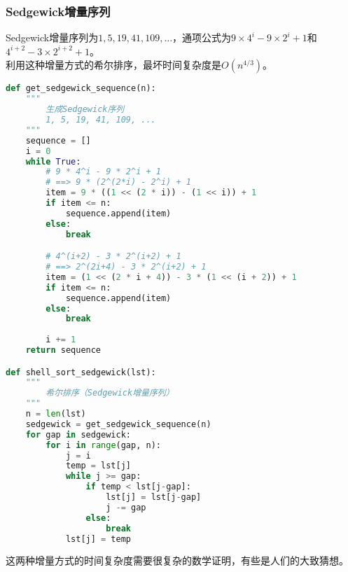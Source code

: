 \subsubsection{Sedgewick增量序列}

Sedgewick增量序列为$ 1, 5, 19, 41, 109, \dots $，通项公式为$ 9 \times 4^i - 9 \times 2^i + 1 $和$ 4^{i+2} - 3 \times 2^{i+2} + 1 $。 \\

利用这种增量方式的希尔排序，最坏时间复杂度是$ O(n^{4/3}) $。 \\


\begin{lstlisting}[language=Python]
def get_sedgewick_sequence(n):
    """
        生成Sedgewick序列
        1, 5, 19, 41, 109, ...
    """
    sequence = []
    i = 0
    while True:
        # 9 * 4^i - 9 * 2^i + 1
        # ==> 9 * (2^(2*i) - 2^i) + 1
        item = 9 * ((1 << (2 * i)) - (1 << i)) + 1
        if item <= n:
            sequence.append(item)
        else:
            break

        # 4^(i+2) - 3 * 2^(i+2) + 1
        # ==> 2^(2i+4) - 3 * 2^(i+2) + 1
        item = (1 << (2 * i + 4)) - 3 * (1 << (i + 2)) + 1
        if item <= n:
            sequence.append(item)
        else:
            break
        
        i += 1
    return sequence

def shell_sort_sedgewick(lst):
    """
        希尔排序（Sedgewick增量序列）
    """
    n = len(lst)
    sedgewick = get_sedgewick_sequence(n)
    for gap in sedgewick:
        for i in range(gap, n):
            j = i
            temp = lst[j]
            while j >= gap:
                if temp < lst[j-gap]:
                    lst[j] = lst[j-gap]
                    j -= gap
                else:
                    break
            lst[j] = temp
\end{lstlisting}

这两种增量方式的时间复杂度需要很复杂的数学证明，有些是人们的大致猜想。

\begin{table}[H]
    \centering
    \caption{希尔排序算法分析}
\end{table}

